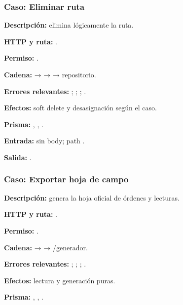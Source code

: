 \subsubsection{Caso: Eliminar ruta}


\textbf{Descripción:} elimina lógicamente la ruta.  

\textbf{HTTP y ruta:} \texttt{}.  

\textbf{Permiso:} \texttt{}.  

\textbf{Cadena:} \texttt{} → \texttt{} → \texttt{} → repositorio.  

\textbf{Errores relevantes:} \texttt{}; \texttt{}; \texttt{}; \texttt{}.  

\textbf{Efectos:} soft delete y desasignación según el caso.  

\textbf{Prisma:} \texttt{}, \texttt{}, \texttt{}.  

\textbf{Entrada:} sin body; path \texttt{}.  

\textbf{Salida:} \texttt{}.


\subsubsection{Caso: Exportar hoja de campo}


\textbf{Descripción:} genera la hoja oficial de órdenes y lecturas.  

\textbf{HTTP y ruta:} \texttt{}.  

\textbf{Permiso:} \texttt{}.  

\textbf{Cadena:} \texttt{} → \texttt{} → \texttt{}/generador.  

\textbf{Errores relevantes:} \texttt{}; \texttt{}; \texttt{}; \texttt{}.  

\textbf{Efectos:} lectura y generación puras.  

\textbf{Prisma:} \texttt{}, \texttt{}, \texttt{}.  

